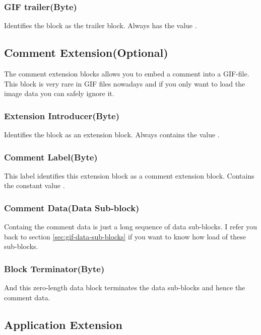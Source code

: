 \begin{refsection}
  \subsubsection{GIF trailer(Byte)}

  Identifies the block as the trailer block. Always has the value
  .

  \subsection{Comment Extension(Optional)}

  The comment extension blocks allows you to embed a comment into a
  GIF-file. This block is very rare in GIF files nowadays and if you
  only want to load the image data you can safely ignore it.

  \subsubsection{Extension Introducer(Byte)}

  Identifies the block as an extension block. Always contains the
  value .

  \subsubsection{Comment Label(Byte)}

  This label identifies this extension block as a comment extension
  block. Contains the constant value .

  \subsubsection{Comment Data(Data Sub-block)}

  Containg the comment data is just a long sequence of data
  sub-blocks. I refer you back to section \ref{sec:gif-data-sub-blocks} if
  you want to know how load of these sub-blocks.

  \subsubsection{Block Terminator(Byte)}

  And this zero-length data block terminates the data sub-blocks and hence
  the comment data.

  \subsection{Application Extension}


\end{refsection}
